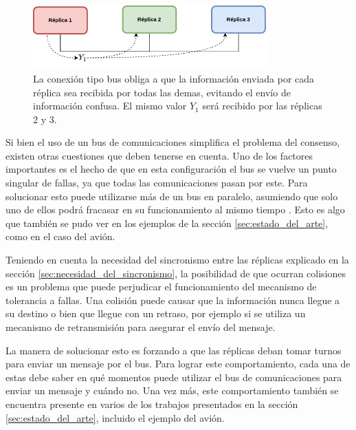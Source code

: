 \begin{figure}[htb]
    \centering
    \includegraphics[width=0.8\textwidth]{img/TMR_bus.png}
    \caption{La conexión tipo bus obliga a que la información enviada por cada réplica sea recibida por todas las demas, evitando el envío de información confusa. El mismo valor $Y_1$ será recibido por las réplicas 2 y 3.}
    \label{fig:TMR_bus}    
\end{figure}


Si bien el uso de un bus de comunicaciones simplifica el problema del consenso, existen otras cuestiones que deben tenerse en cuenta. Uno de los factores importantes es el hecho de que en esta configuración el bus se vuelve un punto singular de fallas, ya que todas las comunicaciones pasan por este. Para solucionar esto puede utilizarse más de un bus en paralelo, asumiendo que solo uno de ellos podrá fracasar en su funcionamiento al mismo tiempo \cite[p.~157]{kopetz-2011}. Esto es algo que también se pudo ver en los ejemplos de la sección \ref{sec:estado_del_arte}, como en el caso del avión.

Teniendo en cuenta la necesidad del sincronismo entre las réplicas explicado en la sección \ref{sec:necesidad_del_sincronismo}, la posibilidad de que ocurran colisiones es un problema que puede perjudicar el funcionamiento del mecanismo de tolerancia a fallas. Una colisión puede causar que la información nunca llegue a su destino o bien que llegue con un retraso, por ejemplo si se utiliza un mecanismo de retransmisión para asegurar el envío del mensaje.

La manera de solucionar esto es forzando a que las réplicas deban tomar turnos para enviar un mensaje por el bus. Para lograr este comportamiento, cada una de estas debe saber en qué momentos puede utilizar el bus de comunicaciones para enviar un mensaje y cuándo no. Una vez más, este comportamiento también se encuentra presente en varios de los trabajos presentados en la sección \ref{sec:estado_del_arte}, incluido el ejemplo del avión.

